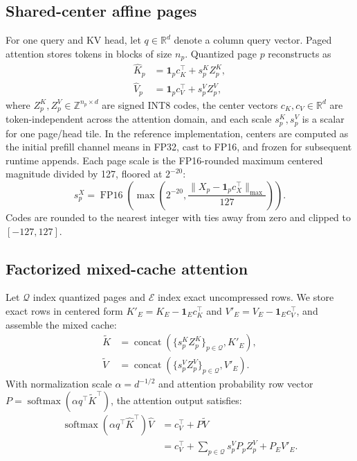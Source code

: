 \documentclass{article}
\newcommand{\Q}{\mathcal Q}
\newcommand{\E}{\mathcal E}
\begin{document}
\subsection{Shared-center affine pages}
For one query and KV head, let $q\in\mathbb R^d$ denote a column query vector. Paged attention stores tokens in blocks of size $n_p$. Quantized page $p$ reconstructs as
\begin{align}
\widehat K_p&=\mathbf1_pc_K^\top+s_p^K Z_p^K,\\
\widehat V_p&=\mathbf1_pc_V^\top+s_p^V Z_p^V,
\end{align}
where $Z_p^K,Z_p^V\in\mathbb Z^{n_p\times d}$ are signed INT8 codes, the center vectors $c_K, c_V \in \mathbb R^d$ are token-independent across the attention domain, and each scale $s_p^K, s_p^V$ is a scalar for one page/head tile.
In the reference implementation, centers are computed as the initial prefill channel means in FP32, cast to FP16, and frozen for subsequent runtime appends. Each page scale is the FP16-rounded maximum centered magnitude divided by 127, floored at $2^{-20}$:
\begin{equation}
s_p^X = \operatorname{FP16}\left(\max\left(2^{-20}, \frac{\|X_p - \mathbf{1}_p c_X^\top\|_{\max}}{127}\right)\right).
\end{equation}
Codes are rounded to the nearest integer with ties away from zero and clipped to $[-127, 127]$.

\subsection{Factorized mixed-cache attention}
Let $\Q$ index quantized pages and $\E$ index exact uncompressed rows. We store exact rows in centered form $K'_E=K_E-\mathbf1_Ec_K^\top$ and $V'_E=V_E-\mathbf1_Ec_V^\top$, and assemble the mixed cache:
\begin{align}
\widetilde K&=\operatorname{concat}(\{s_p^K Z_p^K\}_{p\in\Q},K'_E),\\
\widetilde V&=\operatorname{concat}(\{s_p^V Z_p^V\}_{p\in\Q},V'_E).
\end{align}
With normalization scale $\alpha=d^{-1/2}$ and attention probability row vector $P=\operatorname{softmax}(\alpha q^\top\widetilde K^\top)$, the attention output satisfies:
\begin{equation}
\begin{split}
\operatorname{softmax}(\alpha q^\top\widehat K^\top)\widehat V
&=c_V^\top+P\widetilde V\\
&=c_V^\top+\sum_{p\in\Q}s_p^V P_p Z_p^V+P_E V'_E.
\end{split}
\label{eq:factor}
\end{equation}
\end{document}
